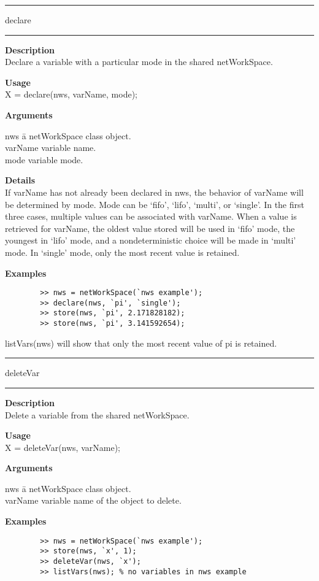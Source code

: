 \rule[0.06in]{6in}{0.01in}
\newline
declare
\newline
\rule{6in}{0.01in}
\begin{list}{}{}
	\item {\bf Description}\\
	Declare a variable with a particular mode in the shared netWorkSpace.
	\item {\bf Usage}\\
	X = declare(nws, varName, mode);
	\item {\bf Arguments}
		\begin{tabbing}
		nws	\hspace{2.5cm} \= a netWorkSpace class object.\\
		varName \> variable name.\\
		mode \>	variable mode.
		\end{tabbing}
	\item {\bf Details}\\
	If varName has not already been declared in nws, the behavior
	of varName will be determined by mode. Mode can be `fifo',
	`lifo', `multi', or `single'. In the first three cases,
	multiple values can be associated with varName. When a value is
	retrieved for varName, the oldest value stored will be used in
	`fifo' mode, the youngest in `lifo' mode, and a
	nondeterministic choice will be made in `multi' mode. In
	`single' mode, only the most recent value is retained.
	\item {\bf Examples}
		\begin{verbatim}
		>> nws = netWorkSpace(`nws example');
		>> declare(nws, `pi', `single');
		>> store(nws, `pi', 2.171828182);
		>> store(nws, `pi', 3.141592654);
		\end{verbatim}

	listVars(nws) will show that only the most recent value of pi is retained.
\end{list}

\rule[0.06in]{6in}{0.01in}
\newline
deleteVar
\newline
\rule{6in}{0.01in}
\begin{list}{}{}
	\item {\bf Description}\\
	Delete a variable from the shared netWorkSpace.
	\item {\bf Usage}\\
	X = deleteVar(nws, varName);
	\item {\bf Arguments}
		\begin{tabbing}
		nws \hspace{2.5cm} \= a netWorkSpace class object.\\
		varName \> variable name of the object to delete.
		\end{tabbing}
	\item {\bf Examples}
		\begin{verbatim}
		>> nws = netWorkSpace(`nws example');
		>> store(nws, `x', 1);
		>> deleteVar(nws, `x');
		>> listVars(nws); % no variables in nws example 
		\end{verbatim}
\end{list}

